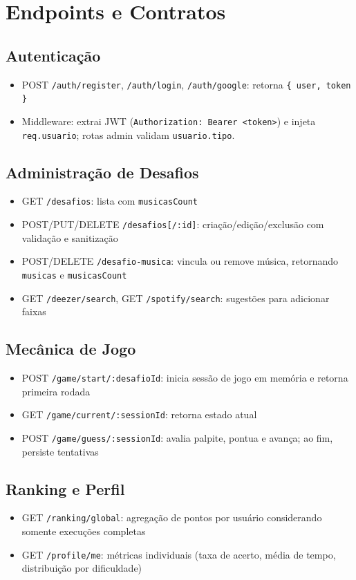 \documentclass[12pt,a4paper]{article}
\begin{document}
\section{Endpoints e Contratos}
\subsection{Autenticação}
\begin{itemize}
  \item POST \texttt{/auth/register}, \texttt{/auth/login}, \texttt{/auth/google}: retorna \texttt{\{ user, token \}}
  \item Middleware: extrai JWT (\texttt{Authorization: Bearer <token>}) e injeta \texttt{req.usuario}; rotas admin validam \texttt{usuario.tipo}.
\end{itemize}

\subsection{Administração de Desafios}
\begin{itemize}
  \item GET \texttt{/desafios}: lista com \texttt{musicasCount}
  \item POST/PUT/DELETE \texttt{/desafios[/:id]}: criação/edição/exclusão com validação e sanitização
  \item POST/DELETE \texttt{/desafio-musica}: vincula ou remove música, retornando \texttt{musicas} e \texttt{musicasCount}
  \item GET \texttt{/deezer/search}, GET \texttt{/spotify/search}: sugestões para adicionar faixas
\end{itemize}

\subsection{Mecânica de Jogo}
\begin{itemize}
  \item POST \texttt{/game/start/:desafioId}: inicia sessão de jogo em memória e retorna primeira rodada
  \item GET \texttt{/game/current/:sessionId}: retorna estado atual
  \item POST \texttt{/game/guess/:sessionId}: avalia palpite, pontua e avança; ao fim, persiste tentativas
\end{itemize}

\subsection{Ranking e Perfil}
\begin{itemize}
  \item GET \texttt{/ranking/global}: agregação de pontos por usuário considerando somente execuções completas
  \item GET \texttt{/profile/me}: métricas individuais (taxa de acerto, média de tempo, distribuição por dificuldade)
\end{itemize}
\end{document}

